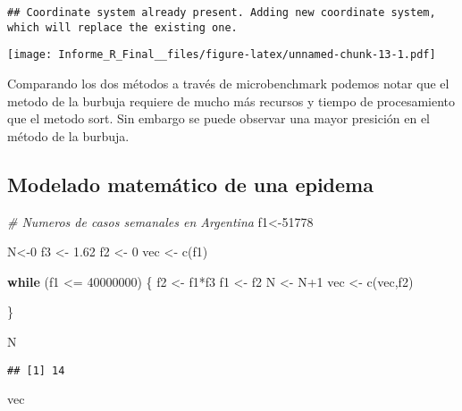 \documentclass[]{elsarticle} %
\newenvironment{Shaded}{\begin{snugshade}}{\end{snugshade}}
\newcommand{\CommentTok}[1]{\textcolor[rgb]{0.56,0.35,0.01}{\textit{#1}}}
\newcommand{\ControlFlowTok}[1]{\textcolor[rgb]{0.13,0.29,0.53}{\textbf{#1}}}
\newcommand{\DecValTok}[1]{\textcolor[rgb]{0.00,0.00,0.81}{#1}}
\newcommand{\FloatTok}[1]{\textcolor[rgb]{0.00,0.00,0.81}{#1}}
\newcommand{\FunctionTok}[1]{\textcolor[rgb]{0.00,0.00,0.00}{#1}}
\newcommand{\NormalTok}[1]{#1}
\newcommand{\OtherTok}[1]{\textcolor[rgb]{0.56,0.35,0.01}{#1}}
\newcommand{\SpecialCharTok}[1]{\textcolor[rgb]{0.00,0.00,0.00}{#1}}
\begin{document}
\begin{verbatim}
## Coordinate system already present. Adding new coordinate system, which will replace the existing one.
\end{verbatim}

\texttt{[image: Informe\_R\_Final\_\_files/figure-latex/unnamed-chunk-13-1.pdf]}

Comparando los dos métodos a través de microbenchmark podemos notar que
el metodo de la burbuja requiere de mucho más recursos y tiempo de
procesamiento que el metodo sort. Sin embargo se puede observar una
mayor presición en el método de la burbuja.

\hypertarget{modelado-matemuxe1tico-de-una-epidema}{%
\subsection{Modelado matemático de una
epidema}\label{modelado-matemuxe1tico-de-una-epidema}}

\begin{Shaded}
\begin{Highlighting}[]
\CommentTok{\# Numeros de casos semanales en Argentina}
\NormalTok{f1}\OtherTok{\textless{}{-}}\DecValTok{51778}

\NormalTok{N}\OtherTok{\textless{}{-}}\DecValTok{0}
\NormalTok{f3 }\OtherTok{\textless{}{-}} \FloatTok{1.62}
\NormalTok{f2 }\OtherTok{\textless{}{-}} \DecValTok{0}
\NormalTok{vec }\OtherTok{\textless{}{-}} \FunctionTok{c}\NormalTok{(f1)}

\ControlFlowTok{while}\NormalTok{ (f1 }\SpecialCharTok{\textless{}=} \DecValTok{40000000}\NormalTok{) \{}
\NormalTok{  f2 }\OtherTok{\textless{}{-}}\NormalTok{ f1}\SpecialCharTok{*}\NormalTok{f3}
\NormalTok{  f1 }\OtherTok{\textless{}{-}}\NormalTok{ f2}
\NormalTok{  N }\OtherTok{\textless{}{-}}\NormalTok{ N}\SpecialCharTok{+}\DecValTok{1}
\NormalTok{  vec }\OtherTok{\textless{}{-}} \FunctionTok{c}\NormalTok{(vec,f2)}
  
\NormalTok{\}}

\NormalTok{N}
\end{Highlighting}
\end{Shaded}

\begin{verbatim}
## [1] 14
\end{verbatim}

\begin{Shaded}
\begin{Highlighting}[]
\NormalTok{vec}
\end{Highlighting}
\end{Shaded}
\end{document}
